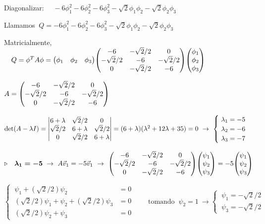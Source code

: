 \vspace{15mm}



\vspace{1cm}
	
\begin{miejercicio}

Diagonalizar: $\quad -6\phi_1^2-6\phi_2^2-6\phi_3^2-\sqrt{2}\phi_1\phi_2	-\sqrt{2}\phi_2\phi_3$
\end{miejercicio}

\vspace{5mm}
\color{MidnightBlue}

Llamamos $\ Q=-6\phi_1^2-6\phi_2^2-6\phi_3^2-\sqrt{2}\phi_1\phi_2	-\sqrt{2}\phi_2\phi_3$

Matricialmente, $\quad Q=\phi^T A \phi =\mqty(\phi_1&\phi_2&\phi_3) \mqty(-6 &-\sqrt{2}/2 &0 \\ -\sqrt{2}/2&-6&-\sqrt{2}/2 \\ 0 & -\sqrt{2}/2&-6 ) \mqty(\phi_1 \\ \phi_2 \\ \phi_3)$

$A=\mqty(-6 &-\sqrt{2}/2 &0 \\ -\sqrt{2}/2&-6&-\sqrt{2}/2 \\ 0 & -\sqrt{2}/2&-6 ) $

$ \det(A-\lambda I)= 
\mqty| 6+\lambda & \sqrt{2}/2 & 0 \\  \sqrt{2}/2 & 6+\lambda &  \sqrt{2}/2 \\ 0& \sqrt{2}/2&6+\lambda |=(6+\lambda)(\lambda^2+12\lambda+35)=0  \ \to \ \begin{cases}  \ \lambda_1=-5 \\ \ \lambda_2=-6 \\ \ \lambda_3=-7 \end{cases}$


$\triangleright \quad 	\boldsymbol{ \lambda_1=-5 } \ \to \ A \vec v_1 = -5 \vec v_1 \ \to \ \mqty(-6 &-\sqrt{2}/2 &0 \\ -\sqrt{2}/2&-6&-\sqrt{2}/2 \\ 0 & -\sqrt{2}/2&-6 ) \mqty( \psi_1 \\ \psi_2 \\ \psi_3) = -5 \mqty( \psi_1 \\ \psi_2 \\ \psi_3) $


$ \begin{cases} \ \psi_1+(\sqrt{2}/2) \psi_2 &=0 \\ \ (\sqrt{2}/2)\psi_1+\psi_2+(\sqrt{2}/2)\psi_3&=0 \\ \ (\sqrt{2}/2)\psi_2+\psi_3&=0 \end{cases} \qquad \text{tomando } \ \psi_2=1 \ \to \begin{cases} \ \psi_1=-\sqrt{2}/2 \\ \ \psi_3=-\sqrt{2}/2 \end{cases}$


